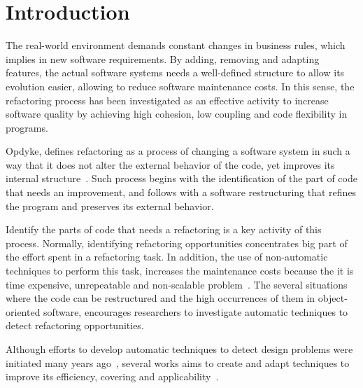 \documentclass[conference]{IEEEtran}
\begin{document}




%
\IEEEpeerreviewmaketitle



\section{Introduction}
\label{sec:introduction}

The real-world environment demands constant changes in business rules, which 
implies in new software requirements. By adding, removing and adapting 
features, the actual software systems needs a well-defined structure to allow 
its evolution easier, allowing to reduce software maintenance costs. In this 
sense, the refactoring process has been investigated as an effective activity
to increase software quality by achieving high cohesion, low coupling and code 
flexibility in programs\cite{Kataoka2002b,Ouni2012f}.

Opdyke, defines refactoring as a process of changing a software 
system in such a way that it does not alter the external behavior of the code, 
yet improves its internal structure~\cite{Opdyke:1992}. Such process begins with
the identification of the part of code that needs an improvement, and
follows with a software restructuring that refines the program and preserves its 
external behavior.

Identify the parts of code that needs a refactoring is a key activity of this 
process. Normally, identifying refactoring opportunities concentrates big part 
of the effort spent in a refactoring task. In addition, the use of 
non-automatic techniques to perform this task, increases the maintenance costs 
because the it is time expensive, unrepeatable and 
non-scalable problem~\cite{Marinescu2001c,Schumacher2010d}. The several situations where the 
code can be restructured and the high occurrences of them in object-oriented 
software, encourages researchers to investigate automatic techniques to detect 
refactoring opportunities.

Although efforts to develop automatic techniques to detect design problems were 
initiated many years ago~\cite{Ciupke:1999}, several works aims to create and 
adapt techniques to improve its efficiency, covering and 
applicability~\cite{Kessentini2011q, Fontana2012c, Khomh2009c, Ouni2012f}.
\end{document}

